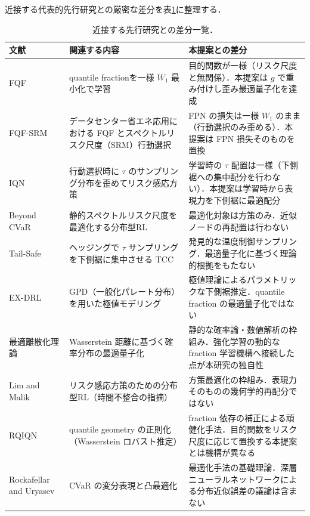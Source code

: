 \documentclass[a4paper,10pt]{jsarticle}
\theoremstyle{definition}
\newcommand{\Wone}{W_1}
\begin{document}
近接する代表的先行研究との厳密な差分を表\ref{tab:novelty}に整理する．
\begin{table}[htbp]
\centering
\caption{近接する先行研究との差分一覧．}
\label{tab:novelty}
\small
\setlength{\tabcolsep}{3pt}
\begin{tabular}{>{\raggedright\arraybackslash}p{3.8cm}>{\raggedright\arraybackslash}p{5.0cm}>{\raggedright\arraybackslash}p{5.6cm}}
\toprule
文献 & 関連する内容 & 本提案との差分\\
\midrule
FQF \cite{yang2019fqf} & quantile fractionを一様 $\Wone$ 最小化で学習 & 目的関数が一様（リスク尺度と無関係）．本提案は $g$ で重み付けし歪み最適量子化を達成\\
FQF-SRM \cite{gan2026energy} & データセンター省エネ応用における FQF とスペクトルリスク尺度（SRM）行動選択 & FPN の損失は一様 $W_1$ のまま（行動選択のみ歪める）．本提案は FPN 損失そのものを置換\\
IQN \cite{dabney2018iqn} & 行動選択時に $\tau$ のサンプリング分布を歪めてリスク感応方策 & 学習時の $\tau$ 配置は一様（下側裾への集中配分を行わない）．本提案は学習時から表現力を下側裾に最適配分\\
Beyond CVaR \cite{moghimi2025beyond} & 静的スペクトルリスク尺度を最適化する分布型RL & 最適化対象は方策のみ．近似ノードの再配置は行わない\\
Tail-Safe \cite{zhang2025tailsafe} & ヘッジングで $\tau$ サンプリングを下側裾に集中させる TCC & 発見的な温度制御サンプリング．最適量子化に基づく理論的根拠をもたない\\
EX-DRL \cite{malekzadeh2024exdrl} & GPD（一般化パレート分布）を用いた極値モデリング & 極値理論によるパラメトリックな下側裾推定．quantile fraction の最適量子化ではない\\
最適離散化理論 \cite{graf2000quantization,pflug2014multistage} & Wasserstein 距離に基づく確率分布の最適量子化 & 静的な確率論・数値解析の枠組み．強化学習の動的な fraction 学習機構へ接続した点が本研究の独自性\\
Lim and Malik \cite{lim2022distributional} & リスク感応方策のための分布型RL（時間不整合の指摘） & 方策最適化の枠組み．表現力そのものの幾何学的再配分ではない\\
RQIQN \cite{zhang2026rqiqn} & quantile geometry の正則化（Wasserstein ロバスト推定） & fraction 依存の補正による頑健化手法．目的関数をリスク尺度に応じて置換する本提案とは機構が異なる\\
Rockafellar and Uryasev \cite{rockafellar2000cvar} & CVaR の変分表現と凸最適化 & 最適化手法の基礎理論．深層ニューラルネットワークによる分布近似誤差の議論は含まない\\
\bottomrule
\end{tabular}
\end{table}
\end{document}
